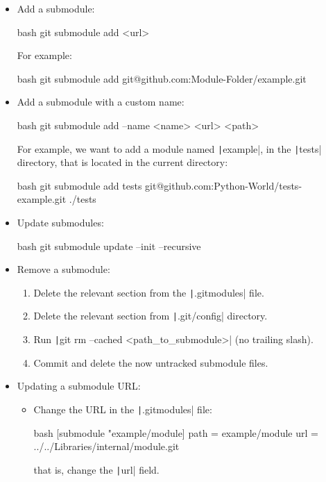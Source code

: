 \begin{itemize}
    \item Add a submodule:
    \begin{mintedbox}{bash}
git submodule add <url>
    \end{mintedbox}
    For example:
    \begin{mintedbox}{bash}
git submodule add git@github.com:Module-Folder/example.git
    \end{mintedbox}
    \item Add a submodule with a custom name:
    \begin{mintedbox}{bash}
git submodule add --name <name> <url> <path>
    \end{mintedbox}
    For example, we want to add a module named \texttt|example|, in the
    \texttt|tests| directory, that is located in the current
    directory:
    \begin{mintedbox}{bash}
git submodule add tests git@github.com:Python-World/tests-example.git ./tests
    \end{mintedbox}
    \item Update submodules:
    \begin{mintedbox}{bash}
git submodule update --init --recursive
    \end{mintedbox}
    \item Remove a submodule:
    \begin{enumerate}
        \item Delete the relevant section from the \texttt|.gitmodules| file.
        \item Delete the relevant section from \texttt|.git/config| directory.
        \item Run \texttt|git rm --cached <path_to_submodule>| (no trailing slash).
        \item Commit and delete the now untracked submodule files.
    \end{enumerate}
    \item Updating a submodule URL:
    \begin{itemize}
        \item Change the URL in the \texttt|.gitmodules| file:
        \begin{mintedbox}{bash}
[submodule "example/module]
    path = example/module
    url = ../../Libraries/internal/module.git
        \end{mintedbox}
        that is, change the \texttt|url| field.

\end{itemize}
\end{itemize}
